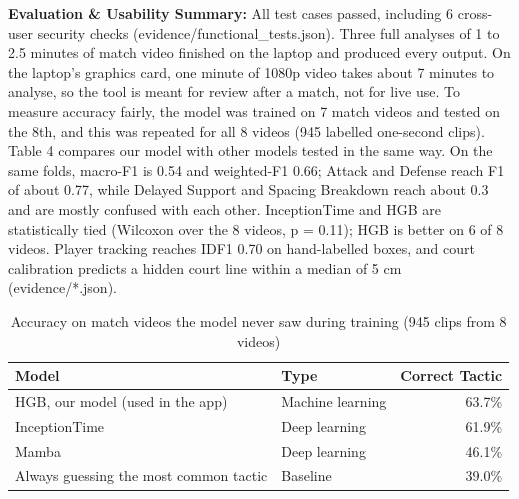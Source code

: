 \documentclass[11pt, a4paper]{article}
\begin{document}
\noindent
\textbf{Evaluation \& Usability Summary:} All test cases passed, including 6 cross-user security checks (evidence/functional\_tests.json). Three full analyses of 1 to 2.5 minutes of match video finished on the laptop and produced every output. On the laptop's graphics card, one minute of 1080p video takes about 7 minutes to analyse, so the tool is meant for review after a match, not for live use. To measure accuracy fairly, the model was trained on 7 match videos and tested on the 8th, and this was repeated for all 8 videos (945 labelled one-second clips). Table 4 compares our model with other models tested in the same way. On the same folds, macro-F1 is 0.54 and weighted-F1 0.66; Attack and Defense reach F1 of about 0.77, while Delayed Support and Spacing Breakdown reach about 0.3 and are mostly confused with each other. InceptionTime and HGB are statistically tied (Wilcoxon over the 8 videos, p = 0.11); HGB is better on 6 of 8 videos. Player tracking reaches IDF1 0.70 on hand-labelled boxes, and court calibration predicts a hidden court line within a median of 5 cm (evidence/*.json).

\begin{table}[H]
    \centering
    \footnotesize
    \renewcommand{\arraystretch}{1.2}
    \begin{tabular}{|l|l|r|}
        \hline
        \textbf{Model} & \textbf{Type} & \textbf{Correct Tactic} \\
        \hline
        HGB, our model (used in the app) & Machine learning & 63.7\% \\
        \hline
        InceptionTime & Deep learning & 61.9\% \\
        \hline
        Mamba & Deep learning & 46.1\% \\
        \hline
        Always guessing the most common tactic & Baseline & 39.0\% \\
        \hline
    \end{tabular}
    \caption{Accuracy on match videos the model never saw during training (945 clips from 8 videos)}
\end{table}
\end{document}
